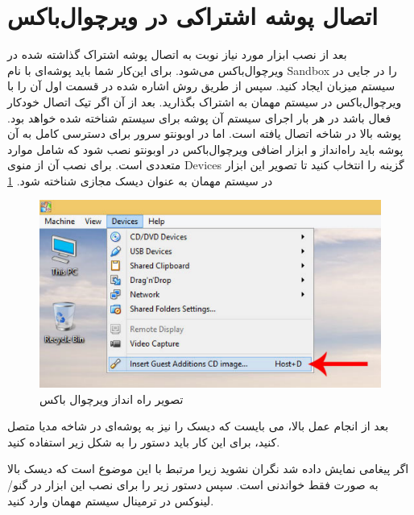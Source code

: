 \section{اتصال پوشه اشتراکی در ویرچوال‌باکس}
بعد از نصب ابزار مورد نیاز نوبت به اتصال پوشه اشتراک گذاشته شده در ویرچوال‌باکس می‌شود. برای این‌کار شما باید پوشه‌ای با نام Sandbox را در جایی در سیستم میزبان ایجاد کنید. سپس از طریق روش اشاره شده در قسمت اول آن را با ویرچوال‌باکس در سیستم مهمان به اشتراک بگذارید. بعد از آن اگر تیک اتصال خودکار فعال باشد در هر بار اجرای سیستم آن پوشه برای سیستم شناخته شده خواهد بود. پوشه بالا در شاخه 
  اتصال یافته است. اما در اوبونتو سرور برای دسترسی کامل به آن پوشه باید راه‌انداز و ابزار اضافی ویرچوال‌باکس در اوبونتو نصب شود که شامل موارد متعددی است. برای نصب آن از منوی Devices گزینه 
   را انتخاب کنید تا تصویر این ابزار در سیستم مهمان به عنوان دیسک مجازی شناخته ‌شود. \ref{VBox5}
  \\
  \begin{figure}
      \includegraphics[width=.89\textwidth ,height=.45\textwidth]{Pic/VBox5}
      \caption{ تصویر راه انداز ویرچوال باکس}
      \label{VBox5}
    \end{figure} 
بعد از انجام عمل بالا، می بایست که دیسک را نیز به پوشه‌ای در شاخه مدیا 
 متصل کنید، برای این کار باید دستور 
 را به شکل زیر استفاده کنید.
\begin{latin}
    
\end{latin}
اگر پیغامی نمایش داده شد نگران نشوید زیرا مرتبط با این موضوع است که دیسک بالا به صورت فقط خواندنی است. سپس دستور زیر را برای نصب این ابزار در گنو/لینوکس در ترمینال سیستم مهمان  وارد کنید.
\begin{latin}
    
\end{latin}
